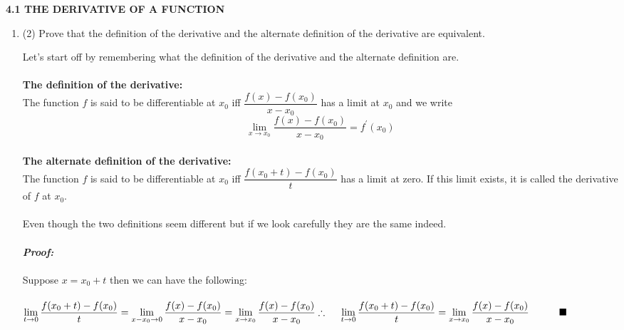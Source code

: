 \documentclass[fleqn]{article}
\begin{document}
  \textbf{4.1 THE DERIVATIVE OF A FUNCTION }
  \begin{enumerate}
    \item (2) Prove that the definition of the derivative and the alternate definition of the derivative are
    equivalent.

        \textcolor{hwColor}{
          \hspace{15pt} Let's start off by remembering what the definition of the derivative and the alternate definition are.
          \\
          \\
          \textbf{The definition of the derivative:}
          \\
          \hspace{15pt} The function $f$ is said to be differentiable at $x_0$ iff $\dfrac{f(x)-f(x_0)}{x-x_0}$ has a limit at $x_0$
          and we write $$\lim\limits_{x \to x_0} \dfrac{f(x)-f(x_0)}{x-x_0}=f^'(x_0)$$
          \\
          \textbf{The alternate definition of the derivative:}
          \\
          \hspace{15pt} The function $f$ is said to be differentiable at $x_0$ iff $\dfrac{f(x_0+t)-f(x_0)}{t}$ has a limit at 
          zero. If this limit exists, it is called the derivative of $f$ at $x_0$.
          \\
          \\
          Even though the two definitions seem different but if we look carefully they are the same indeed.
          \\
          \\
          \emph{\textbf{Proof:}}
          \\
          \\
          Suppose $x=x_0+t$ then we can have the following:
          \\
          \\
          $
            \lim\limits_{t \to 0} \dfrac{f(x_0+t)-f(x_0)}{t}
            \\
            \\
            =\lim\limits_{x-x_0 \to 0} \dfrac{f(x)-f(x_0)}{x-x_0}
            \\
            \\
            =\lim\limits_{x \to x_0} \dfrac{f(x)-f(x_0)}{x-x_0}
            \\
            \\
            \\
            \therefore ~~~~ \lim\limits_{t \to 0} \dfrac{f(x_0+t)-f(x_0)}{t}=\lim\limits_{x \to x_0} \dfrac{f(x)-f(x_0)}{x-x_0} ~~~~~~~~~ \blacksquare
            \\
          $
        }



\end{enumerate}
\end{document}
